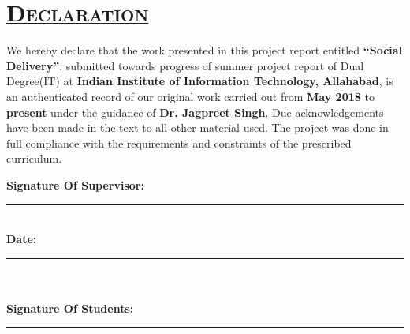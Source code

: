 \documentclass{report}
\begin{document}

{\chapter*{ \quad \quad \quad \quad \quad \quad  \Huge \scshape \underline {Declaration} }
\vspace{2.0cm}
\begin{spacing}{0.3}
\fontsize{17}{68}\selectfont\linespread{10} {We hereby declare that the work presented in this project report entitled \textbf{``Social Delivery''},  submitted towards progress of summer project report of Dual Degree(IT) at \textbf{Indian Institute of Information Technology, Allahabad}, is an authenticated record of our original work carried out from \textbf{May 2018} to \textbf{present} under the guidance of \textbf{Dr. Jagpreet Singh}. Due acknowledgements have been made in the text to all other material used. The project was done in full compliance with the requirements and constraints of the prescribed curriculum.}
\end{spacing}
\vspace{5cm}
\Large
\noindent \textbf{Signature Of Supervisor:}\\
\rule[0.5em]{25em}{0.5pt} %
\vspace{1cm}\\
\noindent \textbf{Date:}\\
\rule[0.5em]{25em}{0.5pt}\\ %
\vspace{1cm}\\
\noindent \textbf{Signature Of Students:}\\
\rule[0.5em]{12em}{0.5pt} %
\vspace{1.5cm}\\

}



{ \doublespacing
{}
\tableofcontents %

\pagebreak
\listoffigures %
\pagebreak
\listoftables %
\pagebreak

}
\end{document}
